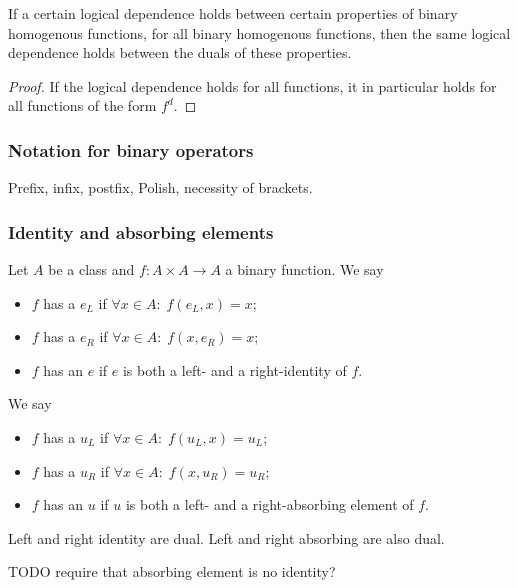 \begin{proposition}
If a certain logical dependence holds between certain properties of binary homogenous functions, for all binary homogenous functions, then the same logical dependence holds between the duals of these properties.
\end{proposition}
\begin{proof}
If the logical dependence holds for all functions, it in particular holds for all functions of the form $f^d$.
\end{proof}

\subsubsection{Notation for binary operators}
Prefix, infix, postfix, Polish, necessity of brackets.

\subsubsection{Identity and absorbing elements}
\begin{definition}
Let $A$ be a class and $f: A\times A \to A$ a binary function. 
We say
\begin{itemize}
\item $f$ has a  $e_L$ if $\forall x\in A:\; f(e_L, x) = x$;
\item $f$ has a  $e_R$ if $\forall x\in A:\; f(x, e_R) = x$;
\item $f$ has an  $e$ if $e$ is both a left- and a right-identity of $f$.
\end{itemize}
We say
\begin{itemize}
\item $f$ has a  $u_L$ if $\forall x\in A:\; f(u_L, x) = u_L$;
\item $f$ has a  $u_R$ if $\forall x\in A:\; f(x, u_R) = u_R$;
\item $f$ has an  $u$ if $u$ is both a left- and a right-absorbing element of $f$.
\end{itemize}
\end{definition}

Left and right identity are dual. Left and right absorbing are also dual.

TODO require that absorbing element is no identity?

